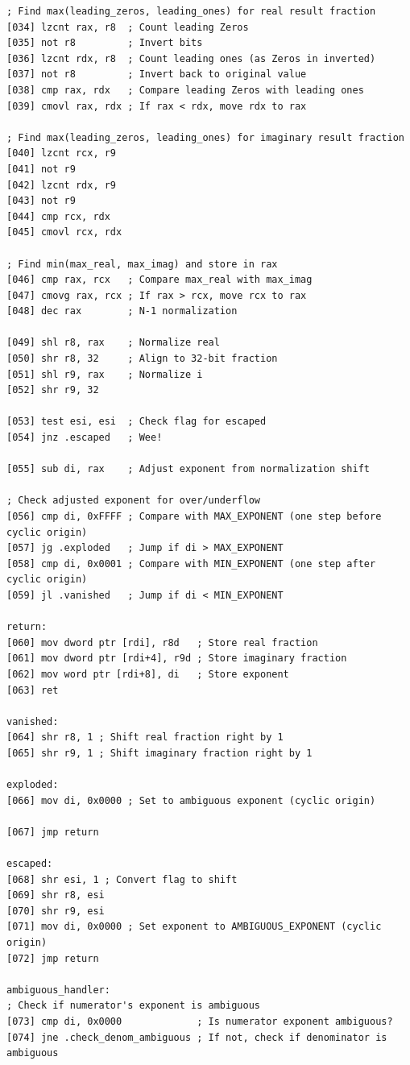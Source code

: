 \documentclass[12pt,letter]{article}
\begin{document}
\begin{lstlisting}[style=rust, caption={Complete Complex Division Assembly Implementation}, label={fig:circle_divide}]
; Find max(leading_zeros, leading_ones) for real result fraction
[034] lzcnt rax, r8  ; Count leading Zeros
[035] not r8         ; Invert bits
[036] lzcnt rdx, r8  ; Count leading ones (as Zeros in inverted)
[037] not r8         ; Invert back to original value
[038] cmp rax, rdx   ; Compare leading Zeros with leading ones
[039] cmovl rax, rdx ; If rax < rdx, move rdx to rax

; Find max(leading_zeros, leading_ones) for imaginary result fraction
[040] lzcnt rcx, r9
[041] not r9
[042] lzcnt rdx, r9
[043] not r9
[044] cmp rcx, rdx
[045] cmovl rcx, rdx

; Find min(max_real, max_imag) and store in rax
[046] cmp rax, rcx   ; Compare max_real with max_imag
[047] cmovg rax, rcx ; If rax > rcx, move rcx to rax
[048] dec rax        ; N-1 normalization

[049] shl r8, rax    ; Normalize real
[050] shr r8, 32     ; Align to 32-bit fraction
[051] shl r9, rax    ; Normalize i
[052] shr r9, 32

[053] test esi, esi  ; Check flag for escaped
[054] jnz .escaped   ; Wee!

[055] sub di, rax    ; Adjust exponent from normalization shift

; Check adjusted exponent for over/underflow
[056] cmp di, 0xFFFF ; Compare with MAX_EXPONENT (one step before cyclic origin)
[057] jg .exploded   ; Jump if di > MAX_EXPONENT
[058] cmp di, 0x0001 ; Compare with MIN_EXPONENT (one step after cyclic origin)
[059] jl .vanished   ; Jump if di < MIN_EXPONENT

return:
[060] mov dword ptr [rdi], r8d   ; Store real fraction
[061] mov dword ptr [rdi+4], r9d ; Store imaginary fraction
[062] mov word ptr [rdi+8], di   ; Store exponent
[063] ret

vanished:
[064] shr r8, 1 ; Shift real fraction right by 1
[065] shr r9, 1 ; Shift imaginary fraction right by 1

exploded:
[066] mov di, 0x0000 ; Set to ambiguous exponent (cyclic origin)

[067] jmp return

escaped:
[068] shr esi, 1 ; Convert flag to shift
[069] shr r8, esi                      
[070] shr r9, esi
[071] mov di, 0x0000 ; Set exponent to AMBIGUOUS_EXPONENT (cyclic origin)
[072] jmp return

ambiguous_handler:
; Check if numerator's exponent is ambiguous
[073] cmp di, 0x0000             ; Is numerator exponent ambiguous?
[074] jne .check_denom_ambiguous ; If not, check if denominator is ambiguous


\end{lstlisting}
\end{document}
